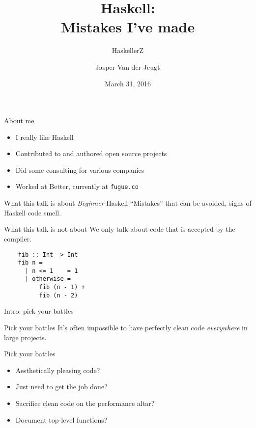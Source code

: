 \documentclass[20pt]{beamer}
\newcommand{\vspaced}{
    \vspace{5mm}
}
\newcommand{\chapterslide}[1]{
    {
        \begin{frame}[plain]
        \begin{center}
        \large{#1}
        \end{center}
        \end{frame}
    }
}
\newcommand{\code}[1]{
    \texttt{\small{#1}}
}
\begin{document}
\title{Haskell:\\
Mistakes I've made}
\subtitle{HaskellerZ}
\author{Jasper Van der Jeugt}
\date{March 31, 2016}

\begin{frame}[plain]
    \titlepage
\end{frame}

\begin{frame}{About me}
    \begin{itemize}
    \item I really like Haskell
    \item Contributed to and authored open source projects
    \item Did some consulting for various companies
    \item Worked at Better, currently at \code{fugue.co}
    \end{itemize}
\end{frame}

\begin{frame}{What this talk is about}
    \emph{Beginner} Haskell ``Mistakes'' that can be avoided, signs of Haskell
    code smell.
\end{frame}

\begin{frame}[fragile]{What this talk is not about}
    We only talk about code that is accepted by the compiler.
    \vspaced
    \begin{lstlisting}
    fib :: Int -> Int
    fib n =
      | n <= 1    = 1
      | otherwise =
          fib (n - 1) +
          fib (n - 2)
    \end{lstlisting}
\end{frame}


\chapterslide{Intro: pick your battles}

\begin{frame}{Pick your battles}
    It's often impossible to have perfectly clean code \emph{everywhere} in
    large projects.
\end{frame}

\begin{frame}{Pick your battles}
    \begin{itemize}
    \item Aesthetically pleasing code?
    \item Just need to get the job done?
    \item Sacrifice clean code on the performance altar?
    \item Document top-level functions?
    \end{itemize}
\end{frame}
\end{document}

